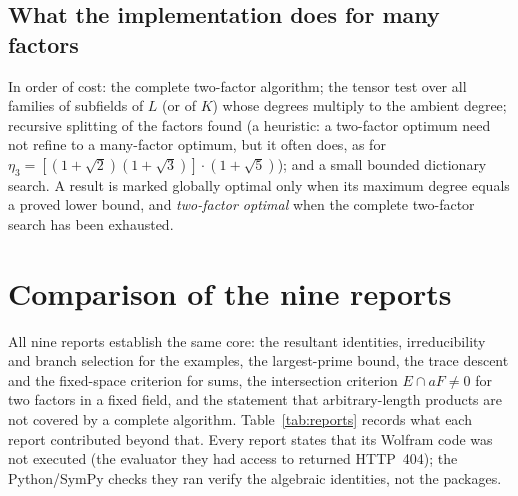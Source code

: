 \documentclass[11pt,a4paper]{article}
\theoremstyle{definition}
\theoremstyle{remark}
\begin{document}
\subsection{What the implementation does for many factors}

In order of cost: the complete two-factor algorithm; the tensor test over all families of subfields of
$L$ (or of $K$) whose degrees multiply to the ambient degree; recursive splitting of the factors
found (a heuristic: a two-factor optimum need not refine to a many-factor optimum, but it often does,
as for $\eta_3=[(1+\sqrt2)(1+\sqrt3)]\cdot(1+\sqrt5)$); and a small bounded dictionary search.  A
result is marked globally optimal only when its maximum degree equals a proved lower bound, and
\emph{two-factor optimal} when the complete two-factor search has been exhausted.

\section{Comparison of the nine reports}\label{sec:reports}

All nine reports establish the same core: the resultant identities, irreducibility and branch
selection for the examples, the largest-prime bound, the trace descent and the fixed-space criterion
for sums, the intersection criterion $E\cap aF\ne0$ for two factors in a fixed field, and the
statement that arbitrary-length products are not covered by a complete algorithm.  Table~\ref{tab:reports}
records what each report contributed beyond that.  Every report states that its Wolfram code was not
executed (the evaluator they had access to returned HTTP~404); the Python/SymPy checks they ran verify
the algebraic identities, not the packages.
\end{document}
